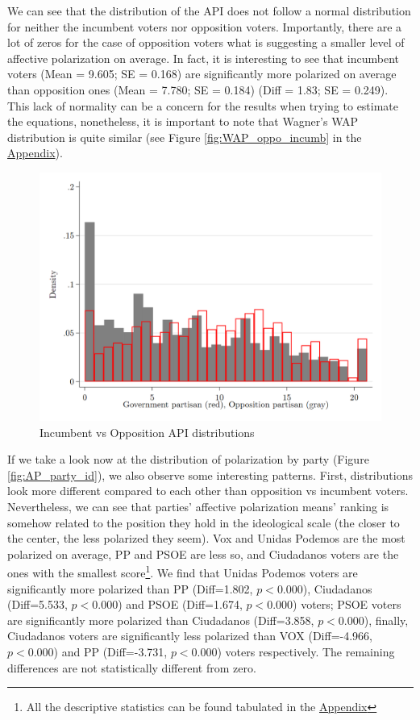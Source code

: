 \documentclass[a4paper, svgnames]{article}
\begin{document}
We can see that the distribution of the API does not follow a normal distribution for neither the incumbent voters nor opposition voters. Importantly, there are a lot of zeros for the case of opposition voters what is suggesting a smaller level of affective polarization on average. In fact, it is interesting to see that incumbent voters (Mean = 9.605; SE = 0.168) are significantly more polarized on average than opposition ones (Mean = 7.780; SE = 0.184) (Diff = 1.83; SE = 0.249). This lack of normality can be a concern for the results when trying to estimate the equations, nonetheless, it is important to note that Wagner's WAP distribution is quite similar (see Figure \ref{fig:WAP_oppo_incumb} in the \hyperref[appendix]{Appendix}).

\begin{figure}[H]
	\centering
	\caption{\label{fig:AP_partisan} Incumbent vs Opposition API distributions}
	\includegraphics[scale=0.25]{Figures/AP_index_by_partisanship.png}
\end{figure}

If we take a look now at the distribution of polarization by party (Figure \ref{fig:AP_party_id}), we also observe some interesting patterns. First, distributions look more different compared to each other than opposition vs incumbent voters. Nevertheless, we can see that parties' affective polarization means' ranking is somehow related to the position they hold in the ideological scale (the closer to the center, the less polarized they seem). Vox and Unidas Podemos are the most polarized on average, PP and PSOE are less so, and Ciudadanos voters are the ones with the smallest score\footnote{All the descriptive statistics can be found tabulated in the \hyperref[appendix]{Appendix}}. We find that Unidas Podemos voters are significantly more polarized than PP (Diff=1.802, $p<0.000$), Ciudadanos (Diff=5.533, $p<0.000$) and PSOE (Diff=1.674, $p<0.000$) voters; PSOE voters are significantly more polarized than Ciudadanos (Diff=3.858, $p<0.000$), finally, Ciudadanos voters are significantly less polarized than VOX (Diff=-4.966, $p<0.000$) and PP (Diff=-3.731, $p<0.000$) voters respectively. The remaining differences are not statistically different from zero.
\end{document}
